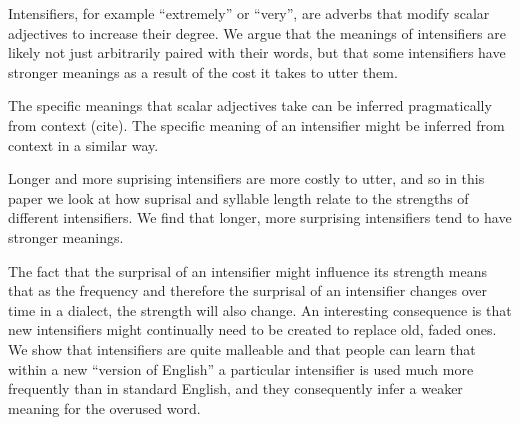 \documentclass[10pt,letterpaper]{article}
\begin{document}


Intensifiers, for example ``extremely'' or ``very'', are adverbs that modify scalar adjectives to increase their degree.
We argue that the meanings of intensifiers are likely not just arbitrarily paired with their words, but that some intensifiers have stronger meanings as a result of the cost it takes to utter them.

The specific meanings that scalar adjectives take can be inferred pragmatically from context (cite).
The specific meaning of an intensifier might be inferred from context in a similar way.

Longer and more suprising intensifiers are more costly to utter, and so in this paper we look at how suprisal and syllable length relate to the strengths of different intensifiers.
We find that longer, more surprising intensifiers tend to have stronger meanings.

The fact that the surprisal of an intensifier might influence its strength means that as the frequency and therefore the surprisal of an intensifier changes over time in a dialect, the strength will also change.
An interesting consequence  is that new intensifiers might continually need to be created to replace old, faded ones.
We show that intensifiers are quite malleable and that people can learn that within a new ``version of English'' a particular intensifier is used much more frequently than in standard English, and they consequently infer a weaker meaning for the overused word.

\end{document}
